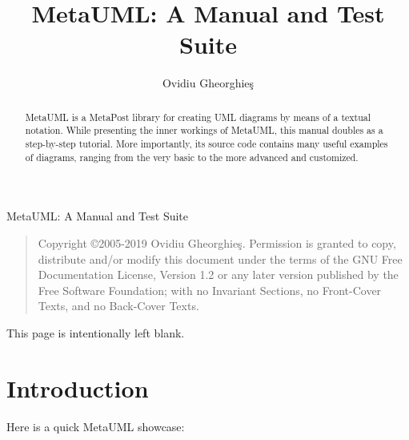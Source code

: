 \documentclass{article}
\begin{document}
MetaUML: A Manual and Test Suite

\begin{quote}
    Copyright \copyright 2005-2019 Ovidiu Gheorghie\c{s}.
    Permission is granted to copy, distribute and/or modify this document
    under the terms of the GNU Free Documentation License, Version 1.2
    or any later version published by the Free Software Foundation;
    with no Invariant Sections, no Front-Cover Texts, and no Back-Cover Texts.
\end{quote}

\pagebreak
This page is intentionally left blank.

\pagebreak
\title{MetaUML: A Manual and Test Suite}

\author{Ovidiu Gheorghie\c{s}}

\maketitle

\begin{abstract}
MetaUML is a MetaPost \cite {metapost} library for creating UML \cite{umlomg} diagrams by means of a textual notation.
While presenting the inner workings of MetaUML, this manual doubles as a step-by-step tutorial.
More importantly, its source code contains many useful examples of diagrams, ranging from the very basic to the
more advanced and customized.
\end{abstract}

\section{Introduction}

Here is a quick MetaUML showcase:
\end{document}
